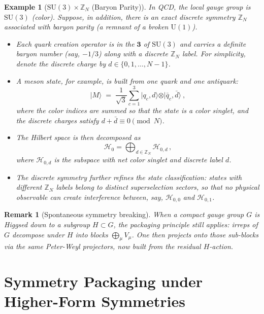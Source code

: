 \documentclass[12pt,a4paper]{article}
\newtheorem{remark}{Remark}
\newtheorem{example}{Example}
\begin{document}
\begin{example}[$\mathrm{SU}(3) \times \mathbb{Z}_N$ (Baryon Parity)]
	In QCD, the local gauge group is $\mathrm{SU}(3)$ (color).
	Suppose, in addition, there is an exact discrete symmetry $\mathbb{Z}_N$ associated with baryon parity (a remnant of a broken $\mathrm{U}(1)$).
	\begin{itemize}
		\item Each quark creation operator is in the $\mathbf{3}$ of $\mathrm{SU}(3)$ and carries a definite baryon number (say, $-1/3$) along with a discrete $\mathbb{Z}_N$ label.
		For simplicity, denote the discrete charge by $d\in\{0,1,\dots,N-1\}$.  
		
		\item A meson state, for example, is built from one quark and one antiquark:
		\[
		\vert M\rangle \;=\; \frac{1}{\sqrt{3}} \sum_{c=1}^3 \vert q_c,d\rangle \otimes \vert \bar{q}_c,\bar{d}\rangle~,
		\]
		where the color indices are summed so that the state is a color singlet, and the discrete charges satisfy $d+\bar{d} \equiv 0 \pmod{N}$.  
		
		\item The Hilbert space is then decomposed as 
		\[
		\mathcal{H}_0 = \bigoplus_{d\in \mathbb{Z}_N} \mathcal{H}_{0,d}\,,
		\]
		where $\mathcal{H}_{0,d}$ is the subspace with net color singlet and discrete label $d$.  
		
		\item The discrete symmetry further refines the state classification:
		states with different $\mathbb{Z}_N$ labels belong to distinct superselection sectors, so that no physical observable can create interference between, say, $\mathcal{H}_{0,0}$ and $\mathcal{H}_{0,1}$.
	\end{itemize}
\end{example}


\begin{remark}[Spontaneous symmetry breaking]
	When a compact gauge group $G$ is Higgsed down to a subgroup $H \subset G$, the packaging principle still applies:
	irreps of $G$ decompose under $H$ into blocks $\bigoplus_{\mu}V_\mu$.
	One then projects onto those sub-blocks via the same Peter-Weyl projectors, now built from the residual $H$-action.
\end{remark}





\section{Symmetry Packaging under Higher-Form Symmetries}
\label{SEC:SymmetryPackagingOnDifferentialForms}
\end{document}
